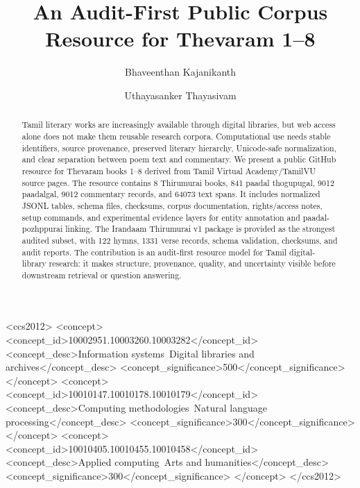 \documentclass[sigconf]{acmart}
\begin{document}
\title[Thevaram 1--8 Corpus Resource]{An Audit-First Public Corpus Resource for Thevaram 1--8}

\author{Bhaveenthan Kajanikanth}

\author{Uthayasanker Thayasivam}

\renewcommand{\shortauthors}{Kajanikanth and Thayasivam}

\begin{abstract}
Tamil literary works are increasingly available through digital libraries, but web access alone does not make them reusable research corpora. Computational use needs stable identifiers, source provenance, preserved literary hierarchy, Unicode-safe normalization, and clear separation between poem text and commentary. We present a public GitHub resource for Thevaram books 1--8 derived from Tamil Virtual Academy/TamilVU source pages. The resource contains 8 Thirumurai books, 841 paadal thogupugal, 9012 paadalgal, 9012 commentary records, and 64073 text spans. It includes normalized JSONL tables, schema files, checksums, corpus documentation, rights/access notes, setup commands, and experimental evidence layers for entity annotation and paadal-pozhppurai linking. The Irandaam Thirumurai v1 package is provided as the strongest audited subset, with 122 hymns, 1331 verse records, schema validation, checksums, and audit reports. The contribution is an audit-first resource model for Tamil digital-library research: it makes structure, provenance, quality, and uncertainty visible before downstream retrieval or question answering.
\end{abstract}

\begin{CCSXML}
<ccs2012>
 <concept>
  <concept_id>10002951.10003260.10003282</concept_id>
  <concept_desc>Information systems~Digital libraries and archives</concept_desc>
  <concept_significance>500</concept_significance>
 </concept>
 <concept>
  <concept_id>10010147.10010178.10010179</concept_id>
  <concept_desc>Computing methodologies~Natural language processing</concept_desc>
  <concept_significance>300</concept_significance>
 </concept>
 <concept>
  <concept_id>10010405.10010455.10010458</concept_id>
  <concept_desc>Applied computing~Arts and humanities</concept_desc>
  <concept_significance>300</concept_significance>
 </concept>
</ccs2012>
\end{CCSXML}
\end{document}
